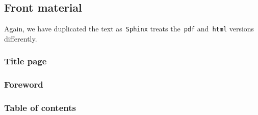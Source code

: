 \documentclass[a4paper,10pt]{article}
\newcommand{\code}[1]{\texttt{#1}}
\begin{document}
% 
% 
% 
% 
% 
% 
% 
% 
% 
% 
% 
% 

\subsection{Front material}

Again, we have duplicated the text as~\code{Sphinx} treats the~\code{pdf} and~\code{html} versions differently.

\subsubsection{Title page}

\subsubsection{Foreword}

\subsubsection{Table of contents}
\end{document}
